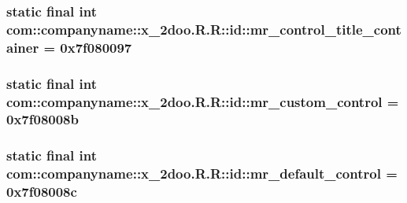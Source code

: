 \hypertarget{classcom_1_1companyname_1_1x__2doo_1_1_r_1_1id_3226d835c4384761f41e614d035be0c9}{
\subsubsection[{mr\_\-control\_\-title\_\-container}]{\setlength{\rightskip}{0pt plus 5cm}static final int com::companyname::x\_\-2doo.R.R::id::mr\_\-control\_\-title\_\-container = 0x7f080097}}
\label{classcom_1_1companyname_1_1x__2doo_1_1_r_1_1id_3226d835c4384761f41e614d035be0c9}


\hypertarget{classcom_1_1companyname_1_1x__2doo_1_1_r_1_1id_ecf9604ba0278e25f4ebab4e38db67b0}{
\subsubsection[{mr\_\-custom\_\-control}]{\setlength{\rightskip}{0pt plus 5cm}static final int com::companyname::x\_\-2doo.R.R::id::mr\_\-custom\_\-control = 0x7f08008b}}
\label{classcom_1_1companyname_1_1x__2doo_1_1_r_1_1id_ecf9604ba0278e25f4ebab4e38db67b0}


\hypertarget{classcom_1_1companyname_1_1x__2doo_1_1_r_1_1id_91463e168a1c5e38a2e592b33720a580}{
\subsubsection[{mr\_\-default\_\-control}]{\setlength{\rightskip}{0pt plus 5cm}static final int com::companyname::x\_\-2doo.R.R::id::mr\_\-default\_\-control = 0x7f08008c}}
\label{classcom_1_1companyname_1_1x__2doo_1_1_r_1_1id_91463e168a1c5e38a2e592b33720a580}


